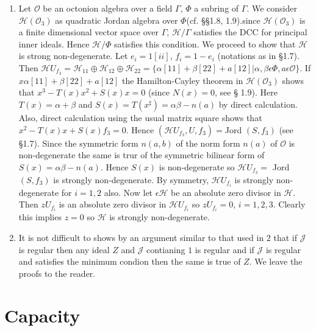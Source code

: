 \begin{examples*}
\begin{enumerate}
\item Let $\mathcal{O}$ be an octonion algebra over a field $\Gamma$,
$\Phi$ a subring of $\Gamma$. We consider
$\mathscr{H}(\mathcal{O}_3)$ as quadratic Jordan algebra over
$\Phi$(cf. \S\S 1.8, 1.9).since $\mathscr{H}(\mathcal{O}_3)$ is a
finite dimensional vector space over $\Gamma$, $\mathscr{H}/\Gamma$
satisfies the DCC for principal inner ideals. Hence
$\mathscr{H}/\Phi$ satisfies this condition. We proceed to show that
$\mathscr{H}$ is strong non-degenerate. Let $e_i=1[ii]$,
$f_i=1-e_i$ (notations as in \S 1.7). Then
$\mathscr{H}U_{f_{3}}=\mathscr{H}_{11}\oplus \mathscr{H}_{12}\oplus
\mathscr{H}_{22}=\{\alpha[11]+\beta[22]+a[12]|\alpha ,\beta\epsilon
\Phi, a\epsilon \mathcal{O}\}$. If $x\alpha[11]+\beta[22]+a[12]$ the
Hamilton-Cayley theorem in $\mathscr{H}(\mathcal{O}_3)$ shows that
$x^{3}-T(x)x^{2}+S(x)x=0$ (since $N(x)=0$, see \S
1.9). Here\pageoriginale $T(x)=\alpha+\beta$ and
$S(x)=T(x^{\sharp})=\alpha\beta-n(a)$ by direct calculation. Also,
direct calculation using the usual matrix square shows that
$x^{2}-T(x)x+S(x)f_3=0$. Hence $(\mathscr{H}U_{f_{3}},U,f_3)=$Jord $(S,
f_3)$ (see \S 1.7). Since the symmetric form $n(a,b)$ of the norm form
$n(a)$ of $\mathcal{O}$ is non-degenerate the same is trur of the
symmetric bilinear form of $S(x)=\alpha\beta-n(a)$. Hence $S(x)$ is
non-degenerate so $\mathscr{H}U_{f_3}=$ Jord $(S,f_3)$ is strongly
non-degenerate. By symmetry, $\mathscr{H}U_{f_i}$ is strongly
non-degenerate for $i=1,2$ also. Now let $\epsilon \mathscr{H}$ be an
absolute zero divisor in $\mathscr{H}$. Then $z U_{f_i}$ is an absolute
zero divisor in $\mathscr{H}U_{f_i}$ so $zU_{f_i}=0$,
$i=1,2,3$. Clearly this implies $z=0$ so $\mathscr{H}$ is strongly
non-degenerate.

\item It is not difficult to shows by an argument similar to that used
in  $2$ that if $\mathscr{J}$ is regular then any ideal $Z$
and $\mathscr{J}$ contianing $1$ is regular and if $\mathscr{J}$ is
regular and satisfies the minimum condion then the same is true of
$Z$. We leave the proofs to the reader.
\end{enumerate}
\end{examples*}

\section{Capacity}\label{c3:sec6}

